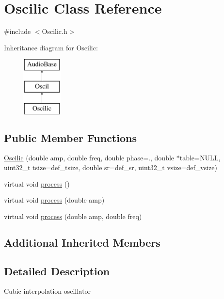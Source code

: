 \hypertarget{class_oscilic}{}\section{Oscilic Class Reference}
\label{class_oscilic}


{\ttfamily \#include $<$Oscilic.\+h$>$}

Inheritance diagram for Oscilic\+:\begin{figure}[H]
\begin{center}
\leavevmode
\includegraphics[height=3.000000cm]{class_oscilic}
\end{center}
\end{figure}
\subsection*{Public Member Functions}
\begin{DoxyCompactItemize}
\item 
\hyperlink{class_oscilic_a7518bfbb2bae80e100af56f5caf58cd8}{Oscilic} (double amp, double freq, double phase=., double $\ast$table=N\+U\+LL, uint32\+\_\+t tsize=def\+\_\+tsize, double sr=def\+\_\+sr, uint32\+\_\+t vsize=def\+\_\+vsize)
\item 
virtual void \hyperlink{class_oscilic_adcff5c6c3fd5a4da4bc76e05091d6dda}{process} ()
\item 
virtual void \hyperlink{class_oscilic_ad97eaf877abdd40fc06499198eb3d9bc}{process} (double amp)
\item 
virtual void \hyperlink{class_oscilic_acce96320f114bbd74114ef87e39660aa}{process} (double amp, double freq)
\end{DoxyCompactItemize}
\subsection*{Additional Inherited Members}


\subsection{Detailed Description}
Cubic interpolation oscillator 

